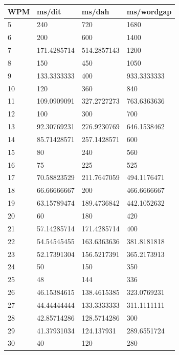 \documentclass[a4paper]{tufte-handout}
\begin{document}
    \begin{table}[!h]
        \footnotesize
        \centering
        \selectfont
        \begin{tabular}{llll}
            \toprule
            WPM & ms/dit & ms/dah & ms/wordgap \\
            \midrule
            5 & 240 & 720 & 1680 \\
            6 & 200 & 600 & 1400 \\
            7 & 171.4285714 & 514.2857143 & 1200 \\
            8 & 150 & 450 & 1050 \\
            9 & 133.3333333 & 400 & 933.3333333 \\
            10 & 120 & 360 & 840 \\
            11 & 109.0909091 & 327.2727273 & 763.6363636 \\
            12 & 100 & 300 & 700 \\
            13 & 92.30769231 & 276.9230769 & 646.1538462 \\
            14 & 85.71428571 & 257.1428571 & 600 \\
            15 & 80 & 240 & 560 \\
            16 & 75 & 225 & 525 \\
            17 & 70.58823529 & 211.7647059 & 494.1176471 \\
            18 & 66.66666667 & 200 & 466.6666667 \\
            19 & 63.15789474 & 189.4736842 & 442.1052632 \\
            20 & 60 & 180 & 420 \\
            21 & 57.14285714 & 171.4285714 & 400 \\
            22 & 54.54545455 & 163.6363636 & 381.8181818 \\
            23 & 52.17391304 & 156.5217391 & 365.2173913 \\
            24 & 50 & 150 & 350 \\
            25 & 48 & 144 & 336 \\
            26 & 46.15384615 & 138.4615385 & 323.0769231 \\
            27 & 44.44444444 & 133.3333333 & 311.1111111 \\
            28 & 42.85714286 & 128.5714286 & 300 \\
            29 & 41.37931034 & 124.137931 & 289.6551724 \\
            30 & 40 & 120 & 280 \\

\end{tabular}
\end{table}
\end{document}
